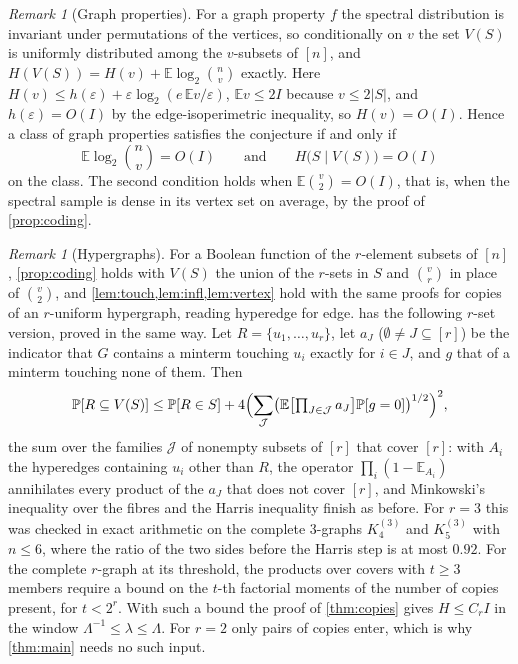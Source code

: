 \documentclass[11pt]{amsart}
\theoremstyle{remark}
\newtheorem{remark}[theorem]{Remark}
\newcommand{\E}{\mathbb{E}}
\renewcommand{\Pr}{\mathbb{P}}
\newcommand{\eps}{\varepsilon}
\begin{document}
\begin{remark}[Graph properties]\label{prop:graphprop}
For a graph property $f$ the spectral distribution is invariant under permutations of the vertices, so conditionally
on $v$ the set $V(S)$ is uniformly distributed among the $v$-subsets of $[n]$, and
$H(V(S))=H(v)+\E\log_2\binom nv$ exactly. Here $H(v)\le h(\eps)+\eps\log_2(e\,\E v/\eps)$, $\E v\le2I$ because
$v\le2|S|$, and $h(\eps)=O(I)$ by the edge-isoperimetric inequality, so $H(v)=O(I)$. Hence a class of graph
properties satisfies the conjecture if and only if
\[
\E\log_2\binom nv=O(I)\qquad\text{and}\qquad H\bigl(S\mid V(S)\bigr)=O(I)
\]
on the class. The second condition holds when $\E\binom v2=O(I)$, that is, when the spectral sample is dense in its
vertex set on average, by the proof of \cref{prop:coding}.
\end{remark}

\begin{remark}[Hypergraphs]\label{rem:hyper}
For a Boolean function of the $r$-element subsets of $[n]$, \cref{prop:coding} holds with $V(S)$ the union of the
$r$-sets in $S$ and $\binom vr$ in place of $\binom v2$, and \cref{lem:touch,lem:infl,lem:vertex} hold with the same
proofs for copies of an $r$-uniform hypergraph, reading hyperedge for edge.  has the following
$r$-set version, proved in the same way. Let $R=\{u_1,\dots,u_r\}$, let $a_J$ ($\emptyset\ne J\subseteq[r]$) be the
indicator that $G$ contains a minterm touching $u_i$ exactly for $i\in J$, and $g$ that of a minterm touching none of
them. Then
\[
\Pr[R\subseteq V(S)]\le\Pr[R\in S]+4\Bigl(\sum_{\mathcal J}\bigl(\E\bigl[\textstyle\prod_{J\in\mathcal J}a_J\bigr]\Pr[g=0]\bigr)^{1/2}\Bigr)^2,
\]
the sum over the families $\mathcal J$ of nonempty subsets of $[r]$ that cover $[r]$: with $A_i$ the hyperedges
containing $u_i$ other than $R$, the operator $\prod_i(1-\E_{A_i})$ annihilates every product of the $a_J$ that does
not cover $[r]$, and Minkowski's inequality over the fibres and the Harris inequality finish as before. For $r=3$ this
was checked in exact arithmetic on the complete $3$-graphs $K^{(3)}_4$ and $K^{(3)}_5$ with $n\le6$, where the ratio of
the two sides before the Harris step is at most $0.92$. For the complete $r$-graph at its threshold, the products over
covers with $t\ge3$ members require a bound on the $t$-th factorial moments of the number of copies present, for
$t<2^r$. With such a bound the proof of \cref{thm:copies} gives $H\le C_r I$ in the window
$\Lambda^{-1}\le\lambda\le\Lambda$. For $r=2$ only pairs of copies enter, which is why \cref{thm:main} needs no such
input.
\end{remark}
\end{document}
